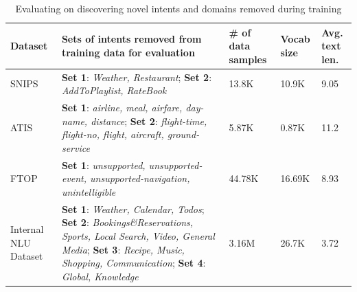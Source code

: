 \begin{table}[t]
\caption{Evaluating \mname{} on discovering novel intents and domains removed during training}
\label{tab:removed} \centering
\small
\hskip-0.4cm\begin{tabularx}{1.03\linewidth}{L{0.15}|L{1.4}|L{0.17}|L{0.13}|L{0.15}}
\hline
\textbf{Dataset} & \textbf{Sets of intents removed from training data for evaluation} & \textbf{\# of data samples} & \textbf{Vocab size} & \textbf{Avg. text len.}  \\
\hline
SNIPS & \textbf{Set 1}: \textit{Weather, Restaurant}; \textbf{Set 2}: \textit{AddToPlaylist, RateBook} & 13.8K & 10.9K & 9.05 \\
ATIS & \textbf{Set 1}: \textit{airline, meal, airfare, day-name, distance}; \textbf{Set 2}: \textit{ flight-time, flight-no, flight, aircraft, ground-service}  & 5.87K & 0.87K & 11.2  \\
FTOP & \textbf{Set 1}:  \textit{unsupported, unsupported-event, unsupported-navigation, unintelligible} & 44.78K & 16.69K  & 8.93  \\
Internal NLU Dataset & \textbf{Set 1}: \textit{Weather, Calendar, Todos}; \textbf{Set 2}: \textit{Bookings\&Reservations, Sports, Local Search, Video, General Media}; \textbf{Set 3}: \textit{Recipe, Music, Shopping, Communication}; \textbf{Set 4}: \textit{Global, Knowledge}  & 3.16M & 26.7K & 3.72 \\
\hline
\end{tabularx}
\end{table}

